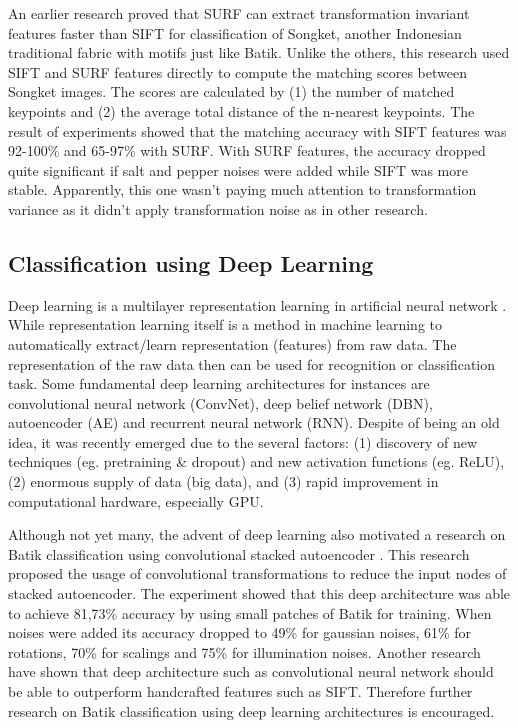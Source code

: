 \documentclass[conference, compsoc]{IEEEtran}
\begin{document}
An earlier research \cite{willy2013evaluation} proved that SURF can extract transformation invariant features faster than SIFT for classification of Songket, another Indonesian traditional fabric with motifs just like Batik. Unlike the others, this research used SIFT and SURF features directly to compute the matching scores between Songket images. The scores are calculated by (1) the number of matched keypoints and (2) the average total distance of the n-nearest keypoints. The result of experiments showed that the matching accuracy with SIFT features was 92-100\% and 65-97\% with SURF. With SURF features, the accuracy dropped quite significant if salt and pepper noises were added while SIFT was more stable. Apparently, this one wasn't paying much attention to transformation variance as it didn't apply transformation noise as in other research\cite{azhar2015batik}.


\subsection{Classification using Deep Learning}

Deep learning is a multilayer representation learning in artificial neural network \cite{lecun2015deep}. While representation learning itself is a method in machine learning to automatically extract/learn representation (features) from raw data. The representation of the raw data then can be used for recognition or classification task. Some fundamental deep learning architectures for instances are convolutional neural network (ConvNet), deep belief network (DBN), autoencoder (AE) and recurrent neural network (RNN). Despite of being an old idea, it was recently emerged due to the several factors: (1) discovery of new techniques (eg. pretraining \& dropout) and new activation functions (eg. ReLU), (2) enormous supply of data (big data), and (3) rapid improvement in computational hardware, especially GPU.

Although not yet many, the advent of deep learning also motivated a research on Batik classification using convolutional stacked autoencoder \cite{menzata2014sistem}. This research proposed the usage of convolutional transformations to reduce the input nodes of stacked autoencoder. The experiment showed that this deep architecture was able to achieve 81,73\% accuracy by using small patches of Batik for training. When noises were added its accuracy dropped to 49\% for gaussian noises, 61\% for rotations, 70\% for scalings and 75\% for illumination noises. Another research have shown that deep architecture such as convolutional neural network should be able to outperform handcrafted features such as SIFT\cite{fischer2014descriptor}. Therefore further research on Batik classification using deep learning architectures is encouraged.
\end{document}
